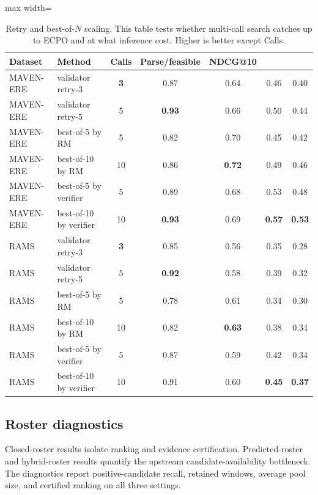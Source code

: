\documentclass{article}
\begin{document}
\begin{table}[h]
\centering
\caption{Retry and best-of-$N$ scaling. This table tests whether multi-call search catches up to ECPO and at what inference cost. Higher is better except Calls.}
\label{tab:bestofn_scaling}
\small
\begin{adjustbox}{max width=\linewidth}
\begin{tabular}{l l c c c c c}
\toprule
Dataset & Method & Calls & Parse/feasible & NDCG@10 & \EvidCons@10 & \CertNDCG@10 \\
\midrule
MAVEN-ERE & validator retry-3 & \textbf{3} & 0.87 & 0.64 & 0.46 & 0.40 \\
MAVEN-ERE & validator retry-5 & 5 & \textbf{0.93} & 0.66 & 0.50 & 0.44 \\
MAVEN-ERE & best-of-5 by RM & 5 & 0.82 & 0.70 & 0.45 & 0.42 \\
MAVEN-ERE & best-of-10 by RM & 10 & 0.86 & \textbf{0.72} & 0.49 & 0.46 \\
MAVEN-ERE & best-of-5 by verifier & 5 & 0.89 & 0.68 & 0.53 & 0.48 \\
MAVEN-ERE & best-of-10 by verifier & 10 & \textbf{0.93} & 0.69 & \textbf{0.57} & \textbf{0.53} \\
\midrule
RAMS & validator retry-3 & \textbf{3} & 0.85 & 0.56 & 0.35 & 0.28 \\
RAMS & validator retry-5 & 5 & \textbf{0.92} & 0.58 & 0.39 & 0.32 \\
RAMS & best-of-5 by RM & 5 & 0.78 & 0.61 & 0.34 & 0.30 \\
RAMS & best-of-10 by RM & 10 & 0.82 & \textbf{0.63} & 0.38 & 0.34 \\
RAMS & best-of-5 by verifier & 5 & 0.87 & 0.59 & 0.42 & 0.34 \\
RAMS & best-of-10 by verifier & 10 & 0.91 & 0.60 & \textbf{0.45} & \textbf{0.37} \\
\bottomrule
\end{tabular}
\end{adjustbox}
\end{table}

\subsection{Roster diagnostics}
\label{sec:app_roster_diagnostics}
Closed-roster results isolate ranking and evidence certification. Predicted-roster and hybrid-roster results quantify the upstream candidate-availability bottleneck. The diagnostics report positive-candidate recall, retained windows, average pool size, and certified ranking on all three settings.
\end{document}
